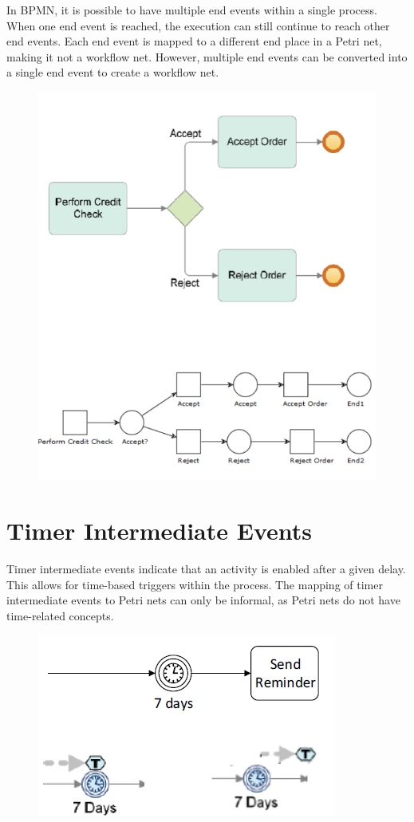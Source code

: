 In BPMN, it is possible to have multiple end events within a single process. When one end event is reached, the execution can still continue to reach other end events. Each end event is mapped to a different end place in a Petri net, making it not a workflow net. However, multiple end events can be converted into a single end event to create a workflow net.
\begin{figure}[h!]
    \centering
    \includegraphics[width=0.75\linewidth]{capitolo 9/11.png}
\end{figure}

\section{Timer Intermediate Events}

Timer intermediate events indicate that an activity is enabled after a given delay. This allows for time-based triggers within the process. The mapping of timer intermediate events to Petri nets can only be informal, as Petri nets do not have time-related concepts.
\begin{figure}[h!]
    \centering
    \includegraphics[width=0.75\linewidth]{capitolo 9/12.png}
\end{figure}
\newpage
